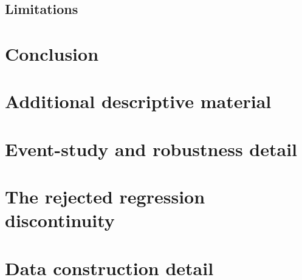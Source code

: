 \documentclass{article}
\begin{document}
\subsection{Limitations}


\section{Conclusion}





\clearpage
\appendix

\section{Additional descriptive material}
\label{app:descriptives}


\section{Event-study and robustness detail}
\label{app:event-study}


\section{The rejected regression discontinuity}
\label{app:rdd}


\section{Data construction detail}
\label{app:data}

\end{document}
